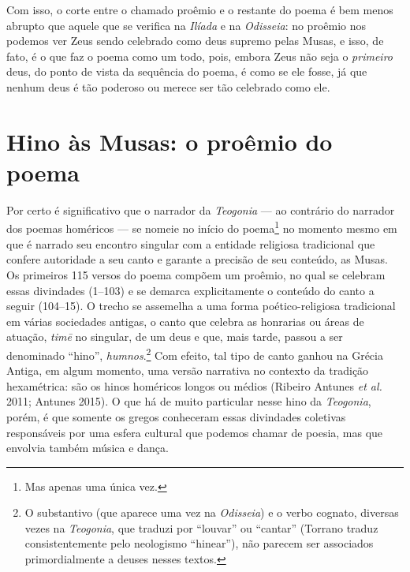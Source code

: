 Com isso, o corte entre o chamado proêmio e o restante do poema é bem
menos abrupto que aquele que se verifica na \textit{Ilíada} e na
\textit{Odisseia}: no proêmio nos podemos ver Zeus sendo celebrado como
deus supremo pelas Musas, e isso, de fato, é o que faz o poema como um
todo, pois, embora Zeus não seja o \textit{primeiro} deus, do ponto de
vista da sequência do poema, é como se ele fosse, já que nenhum deus é
tão poderoso ou merece ser tão celebrado como ele.

\section{Hino às Musas: o proêmio do poema}

Por certo é significativo que o narrador da \textit{Teogonia} --- ao
contrário do narrador dos poemas homéricos --- se nomeie no início do
poema\footnote{Mas apenas uma única vez.} no momento mesmo em que é narrado seu
encontro singular com a entidade religiosa tradicional que confere
autoridade a seu canto e garante a precisão de seu conteúdo, as Musas.
Os primeiros 115 versos do poema compõem um proêmio, no qual se celebram
essas divindades (1--103) e se demarca explicitamente o conteúdo do canto
a seguir (104--15). O trecho se assemelha a uma forma poético-religiosa
tradicional em várias sociedades antigas, o canto que celebra as
honrarias ou áreas de atuação, \textit{timē} no singular, de um deus e
que, mais tarde, passou a ser denominado ``hino'', \textit{humnos}.\footnote{O substantivo (que aparece uma vez na
  \textit{Odisseia}) e o verbo cognato, diversas vezes na
  \textit{Teogonia}, que traduzi por ``louvar'' ou ``cantar''
  (Torrano traduz consistentemente pelo neologismo ``hinear''), não
  parecem ser associados primordialmente a deuses nesses textos.} Com
efeito, tal tipo de canto ganhou na Grécia Antiga, em algum momento, uma
versão narrativa no contexto da tradição hexamétrica: são os hinos
homéricos longos ou médios (Ribeiro Antunes \textit{et al.} 2011; Antunes
2015). O que há de muito particular nesse hino da \textit{Teogonia},
porém, é que somente os gregos conheceram essas divindades coletivas
responsáveis por uma esfera cultural que podemos chamar de poesia, mas
que envolvia também música e dança.

